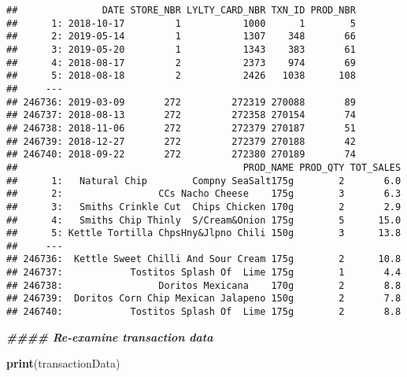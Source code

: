 \documentclass[
]{article}
\newenvironment{Shaded}{\begin{snugshade}}{\end{snugshade}}
\newcommand{\DocumentationTok}[1]{\textcolor[rgb]{0.56,0.35,0.01}{\textbf{\textit{#1}}}}
\newcommand{\FunctionTok}[1]{\textcolor[rgb]{0.13,0.29,0.53}{\textbf{#1}}}
\newcommand{\NormalTok}[1]{#1}
\begin{document}
\begin{verbatim}
##               DATE STORE_NBR LYLTY_CARD_NBR TXN_ID PROD_NBR
##      1: 2018-10-17         1           1000      1        5
##      2: 2019-05-14         1           1307    348       66
##      3: 2019-05-20         1           1343    383       61
##      4: 2018-08-17         2           2373    974       69
##      5: 2018-08-18         2           2426   1038      108
##     ---                                                    
## 246736: 2019-03-09       272         272319 270088       89
## 246737: 2018-08-13       272         272358 270154       74
## 246738: 2018-11-06       272         272379 270187       51
## 246739: 2018-12-27       272         272379 270188       42
## 246740: 2018-09-22       272         272380 270189       74
##                                        PROD_NAME PROD_QTY TOT_SALES
##      1:   Natural Chip        Compny SeaSalt175g        2       6.0
##      2:                 CCs Nacho Cheese    175g        3       6.3
##      3:   Smiths Crinkle Cut  Chips Chicken 170g        2       2.9
##      4:   Smiths Chip Thinly  S/Cream&Onion 175g        5      15.0
##      5: Kettle Tortilla ChpsHny&Jlpno Chili 150g        3      13.8
##     ---                                                            
## 246736:  Kettle Sweet Chilli And Sour Cream 175g        2      10.8
## 246737:            Tostitos Splash Of  Lime 175g        1       4.4
## 246738:                 Doritos Mexicana    170g        2       8.8
## 246739:  Doritos Corn Chip Mexican Jalapeno 150g        2       7.8
## 246740:            Tostitos Splash Of  Lime 175g        2       8.8
\end{verbatim}

\begin{Shaded}
\begin{Highlighting}[]
\DocumentationTok{\#\#\#\# Re{-}examine transaction data}

\FunctionTok{print}\NormalTok{(transactionData)}
\end{Highlighting}
\end{Shaded}
\end{document}

